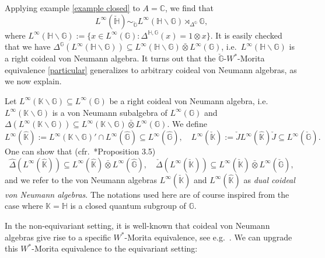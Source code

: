 \documentclass[reqno]{amsart}
\numberwithin{equation}{section}
\newcommand{\G}{\mathbb{G}}
\newcommand{\ovot}{\bar{\otimes}}
\begin{document}
 Applying example \ref{example closed} to $A= \mathbb{C}$, we find that 
 \begin{equation}\label{particular}
    L^\infty(\check{\mathbb{H}})\sim_{\check{\G}} L^\infty(\mathbb{H}\backslash \G) \rtimes_{\Delta^\G} \G,
 \end{equation}
 where $L^\infty(\mathbb{H}\backslash \G):= \{x\in L^\infty(\G): \Delta^{\mathbb{H}, \G}(x)=  1\otimes x\}.$
It is easily checked that we have $\Delta^\G(L^\infty(\mathbb{H}\backslash \G))\subseteq L^\infty(\mathbb{H}\backslash \G)\ovot L^\infty(\G)$, i.e.\ $L^\infty(\mathbb{H}\backslash \G)$ is a right coideal von Neumann algebra. It turns out that the $\check{\G}$-$W^*$-Morita equivalence \eqref{particular} generalizes to arbitrary coideal von Neumann algebras, as we now explain.

Let $L^\infty(\mathbb{K}\backslash \G) \subseteq L^\infty(\G)$ be a right coideal von Neumann algebra, i.e.\ $L^\infty(\mathbb{K}\backslash \G)$ is a von Neumann subalgebra of $L^\infty(\G)$ and $\Delta(L^\infty(\mathbb{K}\backslash \G))\subseteq L^\infty(\mathbb{K}\backslash \G) \ovot L^\infty(\G).$ We define 
$$L^\infty(\hat{\mathbb{K}}):= L^\infty(\mathbb{K}\backslash \G)'\cap L^\infty(\hat{\G})\subseteq L^\infty(\hat{\mathbb{G}}), \quad L^\infty(\check{\mathbb{K}}) := \check{J} L^\infty(\hat{\mathbb{K}}) \check{J}\subseteq L^\infty(\check{\mathbb{G}}).$$
One can show that (cfr.\ \cite{KS14}*{Proposition 3.5})
$$\hat{\Delta}(L^\infty(\hat{\mathbb{K}})) \subseteq L^\infty(\hat{\mathbb{K}}) \ovot L^\infty(\hat{\G}), \quad \check{\Delta}(L^\infty(\check{\mathbb{K}})) \subseteq L^\infty(\check{\mathbb{K}}) \ovot L^\infty(\check{\G}),$$
and we refer to the von Neumann algebras $L^\infty(\check{\mathbb{K}})$ and $L^\infty(\hat{\mathbb{K}})$ as \emph{dual coideal von Neumann algebras}. The notations used here are of course inspired from the case where $\mathbb{K}= \mathbb{H}$ is a closed quantum subgroup of $\G$.

In the non-equivariant setting, it is well-known that coideal von Neumann algebras give rise to a specific $W^*$-Morita equivalence, see e.g.\ \cites{ILS98, KS14,AV23}. We can upgrade this $W^*$-Morita equivalence to the equivariant setting:
\end{document}
